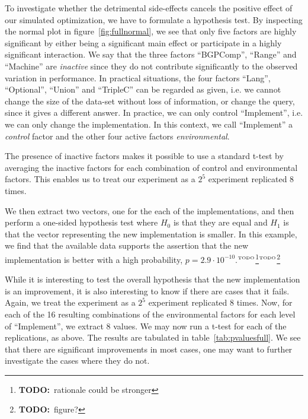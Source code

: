 \documentclass{llncs}
\newcommand{\todo}[1]{\ensuremath{^{\textrm{\tiny{TODO}\normalsize}}}\footnote{\textbf{TODO:}~#1}}
\begin{document}
To investigate whether the detrimental side-effects cancels the
positive effect of our simulated optimization, we have to formulate a
hypothesis test. By inspecting the normal plot in
figure~\ref{fig:fullnormal}, we see that only five factors are highly
significant by either being a significant main effect or participate
in a highly significant interaction. We say that the three factors
``BGPComp'', ``Range'' and ``Machine'' are \emph{inactive} since they
do not contribute significantly to the observed variation in
performance. In practical situations, the four factors ``Lang'',
``Optional'', ``Union'' and ``TripleC'' can be regarded as given,
i.e. we cannot change the size of the data-set without loss of
information, or change the query, since it gives a different
answer. In practice, we can only control ``Implement'', i.e. we can
only change the implementation. In this context, we call ``Implement''
a \emph{control} factor and the other four active factors
\emph{environmental}.

The presence of inactive factors makes it possible to use a standard
t-test by averaging the inactive factors for each combination of
control and environmental factors. This enables us to treat our
experiment as a $2^5$ experiment replicated 8 times.

We then extract two vectors, one for the each of the implementations,
and then perform a one-sided hypothesis test where $H_0$ is that they
are equal and $H_1$ is that the vector representing the new
implementation is smaller. In this example, we find that the available
data supports the assertion that the new implementation is better with a
high probability, $p=2.9 \cdot 10^{-10}$.\todo{rationale could be
  stronger}\todo{figure?}

While it is interesting to test the overall hypothesis that the new
implementation is an improvement, it is also interesting to know if
there are cases that it fails. Again, we treat the experiment as a
$2^5$ experiment replicated 8 times. Now, for each of the 16 resulting
combinations of the environmental factors for each level of
``Implement'', we extract 8 values. We may now run a t-test for each
of the replications, as above. The results are tabulated in
table~\ref{tab:pvaluesfull}. We see that there are significant
improvements in most cases, one may want to further investigate the
cases where they do not.
\end{document}
